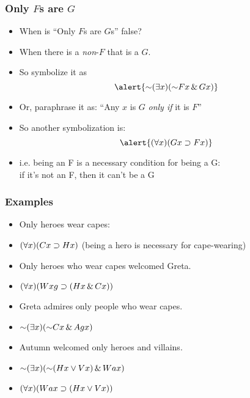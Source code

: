 \begin{frame}
\frametitle{Only $F$s are $G$}

\begin{itemize}[<+->]
\item When is ``Only $F$s are $G$s'' false?
\item When there is a \emph{non}-$F$ that is a $G$.
\item So symbolize it as
\[
  \alert{\enot\qt{\exists}{x}(\enot F\qv{x} \eand G\qv{x})}
  \]
\item Or, paraphrase it as: ``Any $x$ is $G$ \emph{only if} it is $F$''
\item So another symbolization is:
\[
  \alert{\qt{\forall}{x}(G\qv{x} \to F\qv{x})}
\]
\item[] i.e. being an F is a necessary condition for being a G: \\ if it's not an F, then it can't be a G 
\end{itemize}
\end{frame}

\begin{frame}
\frametitle{Examples}

\begin{itemize}[<+->]
  \item Only heroes wear capes: \\
  \item[] \alert{$(\forall x)(Cx \supset Hx)$} (being a hero is necessary for cape-wearing)
  \item Only heroes who wear capes welcomed Greta.\\
  \item[] \alert{$(\forall x)(Wxg \supset (Hx \,\&\, Cx))$}
  \item Greta admires only people who wear capes.
  \item[] \alert{$\enot\qt{\exists}{x}(\enot  C\qv{x} \eand A\qr{g}{x})$}
  \item Autumn welcomed only heroes and villains.
  \item[] \alert{$\enot\qt{\exists}{x}(\enot (H\qv{x} \eor V\qv{x}) \eand W\qr{a}{x})$}
  \item[] \alert{$(\forall x)(Wax \supset (Hx \vee Vx))$}
\end{itemize}
\end{frame}

